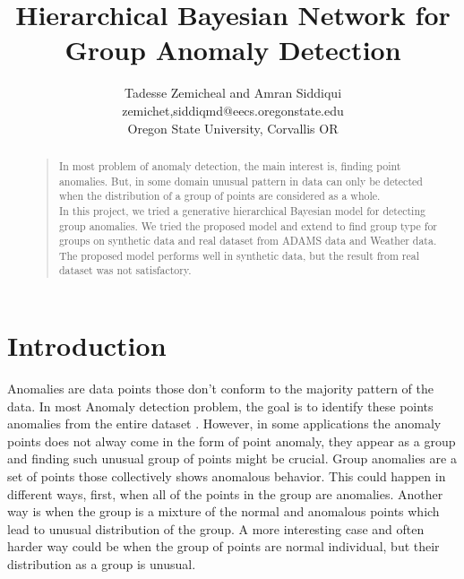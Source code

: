 \documentclass[letterpaper]{article}
\begin{document}
%
\title{Hierarchical Bayesian Network for Group Anomaly Detection}
\author{Tadesse Zemicheal and Amran Siddiqui\\
{zemichet,siddiqmd}@eecs.oregonstate.edu\\
Oregon State University, Corvallis OR\\
}
\maketitle
\begin{abstract}
\begin{quote}
In most problem of anomaly detection, the main interest is, finding point anomalies. But, in some domain unusual pattern in data can only be detected when the distribution of a group of points are considered as a whole. \\
In this project, we tried a generative hierarchical Bayesian model for detecting group anomalies. We tried the proposed model and extend to find group type for groups on synthetic data and real dataset from ADAMS data and Weather data. The proposed model performs well in synthetic data, but the result from real dataset was not satisfactory.  
\end{quote}
\end{abstract}

\section{Introduction}
Anomalies are data points those don't conform to the majority pattern of the data. In most Anomaly detection problem, the goal is to identify these points anomalies from the entire dataset \cite{chandola2009anomaly}. However, in some applications the anomaly points does not alway  come in the form of point anomaly, they appear as a group and finding such unusual group of points might be crucial. Group anomalies are a set of points those collectively shows anomalous behavior. This could happen in different ways, first, when all of the points in the group are anomalies. Another way is when the group is a mixture of the normal and anomalous points which lead to unusual distribution of the group. A more interesting case and often harder way could be when the group of points are normal individual, but their distribution as a group is unusual.
\end{document}
